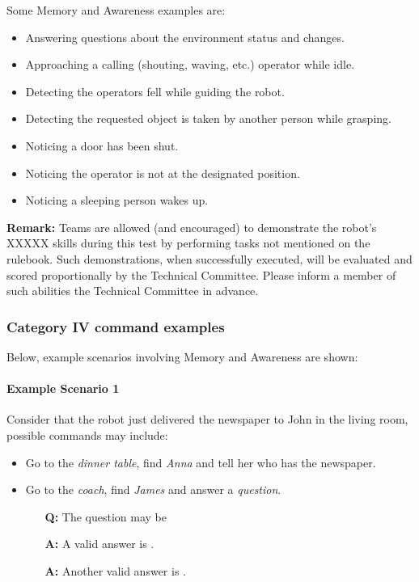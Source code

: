Some Memory and Awareness examples are:
\begin{itemize}
	\item Answering questions about the environment status and changes.
	\item Approaching a calling (shouting, waving, etc.) operator while idle.
	\item Detecting the operators fell while guiding the robot.
	\item Detecting the requested object is taken by another person while grasping.
	\item Noticing a door has been shut.
	\item Noticing the operator is not at the designated position.
	\item Noticing a sleeping person wakes up.
\end{itemize}

\textbf{Remark:} Teams are allowed (and encouraged) to demonstrate the robot's XXXXX skills during this test by performing tasks not mentioned on the rulebook. Such demonstrations, when successfully executed, will be evaluated and scored proportionally by the Technical Committee. Please inform a member of such abilities the Technical Committee in advance.

\subsubsection{Category IV command examples}
Below, example scenarios involving Memory and Awareness are shown:

\paragraph{Example Scenario 1}
Consider that the robot just delivered the newspaper to John in the living room, possible commands may include:

\begin{itemize}
	\item Go to the \textit{dinner table}, find \textit{Anna} and tell her who has the newspaper.
	\item Go to the \textit{coach}, find \textit{James} and answer a \textit{question}.
	\begin{itemize} 
		\item[\textbf{Q:}] The question may be 
		\item[\textbf{A:}] A valid answer is .
		\item[\textbf{A:}] Another valid answer is .
	\end{itemize}
\end{itemize}

